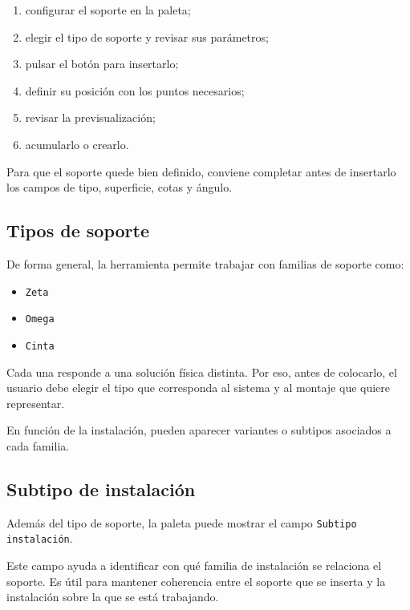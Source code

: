 \begin{enumerate}
\item configurar el soporte en la paleta;
\item elegir el tipo de soporte y revisar sus parámetros;
\item pulsar el botón para insertarlo;
\item definir su posición con los puntos necesarios;
\item revisar la previsualización;
\item acumularlo o crearlo.
\end{enumerate}

Para que el soporte quede bien definido, conviene completar antes de insertarlo los campos de tipo, superficie, cotas y ángulo.

\subsection{Tipos de soporte}

De forma general, la herramienta permite trabajar con familias de soporte como:

\begin{itemize}
\item \texttt{Zeta}
\item \texttt{Omega}
\item \texttt{Cinta}
\end{itemize}

Cada una responde a una solución física distinta. Por eso, antes de colocarlo, el usuario debe elegir el tipo que corresponda al sistema y al montaje que quiere representar.

En función de la instalación, pueden aparecer variantes o subtipos asociados a cada familia.

\subsection{Subtipo de instalación}

Además del tipo de soporte, la paleta puede mostrar el campo \texttt{Subtipo instalación}.

Este campo ayuda a identificar con qué familia de instalación se relaciona el soporte. Es útil para mantener coherencia entre el soporte que se inserta y la instalación sobre la que se está trabajando.


